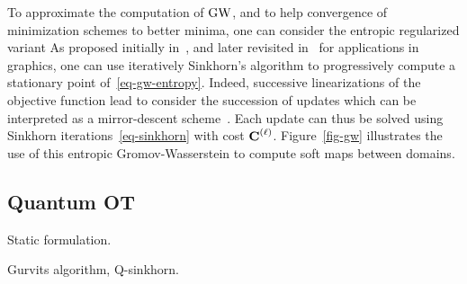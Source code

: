 To approximate the computation of $\operatorname{\mathrm{GW}}$, and to help convergence of minimization schemes to better minima, one can consider the entropic regularized variant
As proposed initially in~\cite{gold-1996,rangarajan-1999}, and later revisited in~\cite{2016-solomon-gw} for applications in graphics, one can use iteratively Sinkhorn's algorithm to progressively compute a stationary point of~\eqref{eq-gw-entropy}. 
%
Indeed, successive linearizations of the objective function lead to consider the succession of updates
\eql{\label{eq-gw-sinkh}
	\itt{\P} \eqdef \umin{ \P \in \CouplingsD(\a,\b) } \dotp{\P}{\it{\C}} - \epsilon\H(\P)
		\qwhereq
}
which can be interpreted as a mirror-descent scheme~\cite{2016-solomon-gw}. Each update can thus be solved using Sinkhorn iterations~\eqref{eq-sinkhorn} with cost $\mathrm{\textbf{\upshape C}}^{(\ell)}$. Figure~\eqref{fig-gw} illustrates the use of this entropic Gromov-Wasserstein to compute soft maps between domains. 


\subsection{Quantum OT}

Static formulation.

Gurvits algorithm, Q-sinkhorn.